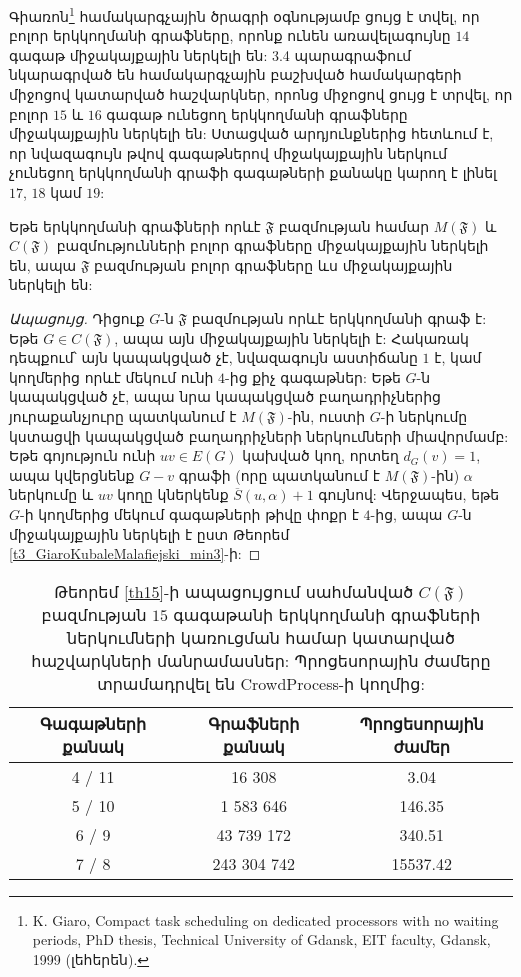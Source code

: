 Գիառոն\footnote{K. Giaro, Compact task scheduling on dedicated processors with no waiting periods, PhD thesis, Technical University of Gdansk, EIT faculty, Gdansk, 1999 (լեհերեն).} համակարգչային ծրագրի օգնությամբ ցույց է տվել, որ բոլոր երկկողմանի գրաֆները, որոնք ունեն առավելագույնը $14$ գագաթ միջակայքային ներկելի են: 3.4 պարագրաֆում նկարագրված են համակարգչային բաշխված համակարգերի միջոցով կատարված հաշվարկներ, որոնց միջոցով ցույց է տրվել, որ բոլոր $15$ և $16$ գագաթ ունեցող երկկողմանի գրաֆները միջակայքային ներկելի են: Ստացված արդյունքներից հետևում է, որ նվազագույն թվով գագաթներով միջակայքային ներկում չունեցող երկկողմանի գրաֆի գագաթների քանակը կարող է լինել $17$, $18$ կամ $19$:

\begin{hide}
\begin{lemma}
\label{mainLemma}
Եթե երկկողմանի գրաֆների որևէ $\mathfrak{F}$ բազմության համար $M(\mathfrak{F})$ և $C(\mathfrak{F})$ բազմությունների բոլոր գրաֆները միջակայքային ներկելի են, ապա $\mathfrak{F}$ բազմության բոլոր գրաֆները ևս միջակայքային ներկելի են:
\end{lemma}
\begin{proof}[Ապացույց]
Դիցուք $G$-ն $\mathfrak{F}$ բազմության որևէ երկկողմանի գրաֆ է: Եթե $G \in C(\mathfrak{F})$, ապա այն միջակայքային ներկելի է: Հակառակ դեպքում՝ այն կապակցված չէ, նվազագույն աստիճանը $1$ է, կամ կողմերից որևէ մեկում ունի $4$-ից քիչ գագաթներ: Եթե $G$-ն կապակցված չէ, ապա նրա կապակցված բաղադրիչներից յուրաքանչյուրը պատկանում է $M(\mathfrak{F})$-ին, ուստի $G$-ի ներկումը կստացվի կապակցված բաղադրիչների ներկումների միավորմամբ: Եթե գոյություն ունի $uv \in E(G)$ կախված կող, որտեղ $d_G(v)=1$, ապա կվերցնենք $G-v$ գրաֆի (որը պատկանում է $M(\mathfrak{F})$-ին) $\alpha$ ներկումը և $uv$ կողը կներկենք $\overline{S}(u,\alpha) + 1$ գույնով: Վերջապես, եթե $G$-ի կողմերից մեկում գագաթների թիվը փոքր է $4$-ից, ապա $G$-ն միջակայքային ներկելի է ըստ Թեորեմ \ref{t3_GiaroKubaleMalafiejski_min3}-ի:
\end{proof}
\begin{table}[t]
\renewcommand{\arraystretch}{1.2}
\begin{center}
\begin{tabular}{|c|c|c|}
\hline
Գագաթների քանակ & Գրաֆների քանակ & Պրոցեսորային ժամեր \\
\hline
4 / 11 & 16 308 & 3.04 \\
\hline
5 / 10 & 1 583 646 & 146.35 \\
\hline
6 / 9 & 43 739 172 & 340.51\\
\hline
7 / 8 & 243 304 742 & 15537.42\\
\hline
\end{tabular}
\end{center}
\caption{Թեորեմ \ref{th15}-ի ապացույցում սահմանված $C(\mathfrak{F})$ բազմության $15$ գագաթանի երկկողմանի գրաֆների ներկումների կառուցման համար կատարված հաշվարկների մանրամասներ: Պրոցեսորային ժամերը տրամադրվել են CrowdProcess-ի կողմից:}
\label{table15}
\end{table}


\end{hide}
